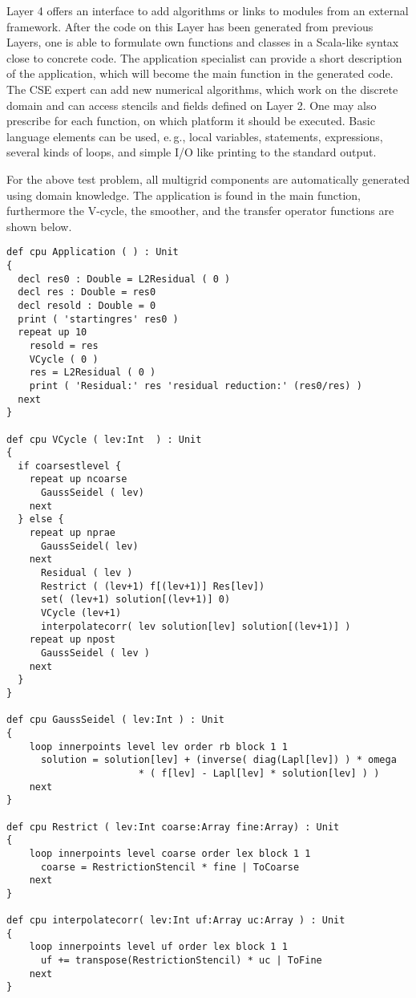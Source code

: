 \documentclass[onecolumn]{svjour3}
\begin{document}
Layer 4 offers an interface to add algorithms or links to modules from an external framework. After the code on this Layer has been generated from previous Layers, one is able to formulate own functions and classes in a Scala-like syntax close to concrete code. 
The application specialist can provide a short description of the application, which will become the main function in the generated code. The CSE expert can add new numerical algorithms, which work on the discrete domain and can access stencils and fields defined on Layer 2. One may also prescribe for each function, on which platform it should be executed. Basic language elements can be used, e.\,g., local variables, statements, expressions, several kinds of loops, and simple I/O like printing to the standard output. 

For the above test problem, all multigrid components are automatically generated using domain knowledge. The application is found in the main function, furthermore the V-cycle, the smoother, and the transfer operator functions are shown below. 
\begin{verbatim}
def cpu Application ( ) : Unit 
{  
  decl res0 : Double = L2Residual ( 0 ) 
  decl res : Double = res0 
  decl resold : Double = 0 
  print ( 'startingres' res0 ) 
  repeat up 10 
    resold = res 
    VCycle ( 0 ) 
    res = L2Residual ( 0 ) 
    print ( 'Residual:' res 'residual reduction:' (res0/res) ) 
  next  
}  

def cpu VCycle ( lev:Int  ) : Unit 
{ 
  if coarsestlevel { 
    repeat up ncoarse 
      GaussSeidel ( lev) 
    next  
  } else { 
    repeat up nprae 
      GaussSeidel( lev) 
    next  
	  Residual ( lev ) 
	  Restrict ( (lev+1) f[(lev+1)] Res[lev]) 
	  set( (lev+1) solution[(lev+1)] 0) 
	  VCycle (lev+1) 
	  interpolatecorr( lev solution[lev] solution[(lev+1)] ) 
    repeat up npost 
      GaussSeidel ( lev ) 
    next  
  } 
} 

def cpu GaussSeidel ( lev:Int ) : Unit  
{ 
    loop innerpoints level lev order rb block 1 1 
      solution = solution[lev] + (inverse( diag(Lapl[lev]) ) * omega 
			           * ( f[lev] - Lapl[lev] * solution[lev] ) ) 
    next  
}  

def cpu Restrict ( lev:Int coarse:Array fine:Array) : Unit  
{ 
    loop innerpoints level coarse order lex block 1 1  
      coarse = RestrictionStencil * fine | ToCoarse  
    next  
}  

def cpu interpolatecorr( lev:Int uf:Array uc:Array ) : Unit 
{ 
    loop innerpoints level uf order lex block 1 1  
      uf += transpose(RestrictionStencil) * uc | ToFine  
    next  
}  
\end{verbatim}
\end{document}
